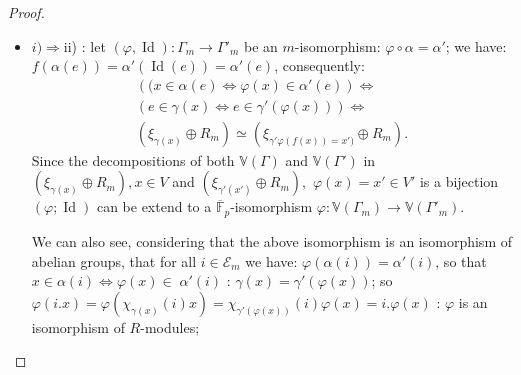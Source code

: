 \documentclass[preprint,12pt,authoryear]{elsarticle}
\theoremstyle{definition}
\DeclareMathOperator{\Id}{Id}
\begin{document}
\begin{proof}\mbox{}

\begin{itemize}
\item[-] $i)\Longrightarrow $ii) : let $(\varphi, \Id) : \Gamma_m \longrightarrow \Gamma'_m$ be an $m$-isomorphism: $\varphi \circ \alpha=\alpha'$; we have: 
$f(\alpha(e))=\alpha'(\Id(e))= \alpha'(e)$, consequently:
\begin{equation*}
\begin{array}{l}
\left((x\in \alpha(e)\Longleftrightarrow \varphi(x)\in \alpha'(e)\right)\Longleftrightarrow\\
\left(e\in \gamma(x)\Longleftrightarrow  e\in \gamma'(\varphi(x))\right)\Longleftrightarrow\\
 \left(\xi_{\gamma(x)}\oplus R_m\right)\simeq \left(\xi_{\gamma'\varphi(f(x))=x')}\oplus R_m\right).  
\end{array}
\end{equation*}
Since the decompositions of  both $\mathbb{V}(\Gamma)$ and $\mathbb{V}(\Gamma')$  in $\left(\xi_{\gamma(x)}\oplus R_m\right), x\in V$ and  
$\left(\xi_{\gamma'(x')}\oplus R_m\right),$ $\varphi(x)=x'\in V'$ is a bijection $(\varphi; \Id)$  can be extend to a $\overline{\mathbb{F}}_p$-isomorphism 
$\varphi : \mathbb{V}(\Gamma_m) \longrightarrow \mathbb{V}(\Gamma'_m)$.
  
 \noindent We can also see, considering that the above isomorphism is an isomorphism of abelian groups,   that for all $i\in\mathcal{E}_m$ we have:  ${\displaystyle \varphi(\alpha(i))=\alpha'(i)}$, so that
${\displaystyle  x \in \alpha(i) \Longleftrightarrow \varphi(x)\in \; \alpha'(i)}$ : 
${\displaystyle  \gamma(x)=\gamma'(\varphi(x))}$; so ${\displaystyle  \varphi(i.x)=\varphi(\chi_{\gamma(x)}(i)x)=\chi_{\gamma'(\varphi(x))}(i)\varphi(x)=i.\varphi(x)}$ : $\varphi$ is an isomorphism of $R$-modules;



\end{itemize}
\end{proof}
\end{document}
